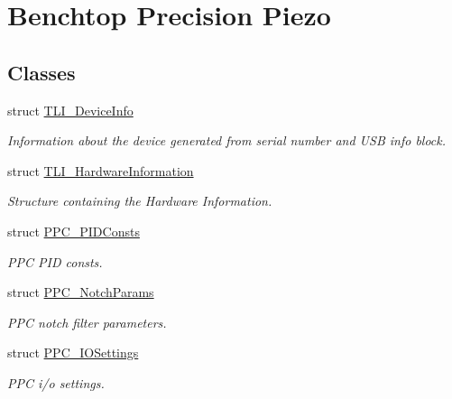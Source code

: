 \hypertarget{group___benchtop_precision_piezo}{}\section{Benchtop Precision Piezo}
\label{group___benchtop_precision_piezo}
\subsection*{Classes}
\begin{DoxyCompactItemize}
\item 
struct \hyperlink{struct_t_l_i___device_info}{T\+L\+I\+\_\+\+Device\+Info}
\begin{DoxyCompactList}\small\item\em Information about the device generated from serial number and U\+SB info block. \end{DoxyCompactList}\item 
struct \hyperlink{struct_t_l_i___hardware_information}{T\+L\+I\+\_\+\+Hardware\+Information}
\begin{DoxyCompactList}\small\item\em Structure containing the Hardware Information. \end{DoxyCompactList}\item 
struct \hyperlink{struct_p_p_c___p_i_d_consts}{P\+P\+C\+\_\+\+P\+I\+D\+Consts}
\begin{DoxyCompactList}\small\item\em P\+PC P\+ID consts. \end{DoxyCompactList}\item 
struct \hyperlink{struct_p_p_c___notch_params}{P\+P\+C\+\_\+\+Notch\+Params}
\begin{DoxyCompactList}\small\item\em P\+PC notch filter parameters. \end{DoxyCompactList}\item 
struct \hyperlink{struct_p_p_c___i_o_settings}{P\+P\+C\+\_\+\+I\+O\+Settings}
\begin{DoxyCompactList}\small\item\em P\+PC i/o settings. \end{DoxyCompactList}\end{DoxyCompactItemize}
